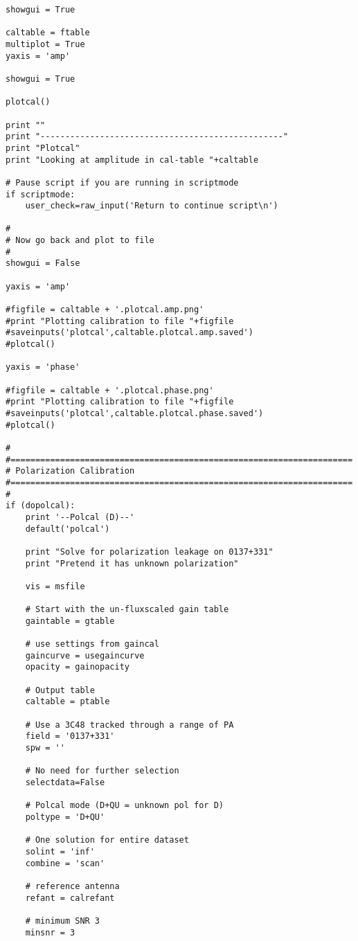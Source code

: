 \begin{verbatim}
showgui = True
    
caltable = ftable
multiplot = True
yaxis = 'amp'

showgui = True
    
plotcal()

print ""
print "-------------------------------------------------"
print "Plotcal"
print "Looking at amplitude in cal-table "+caltable

# Pause script if you are running in scriptmode
if scriptmode:
    user_check=raw_input('Return to continue script\n')

#
# Now go back and plot to file
#
showgui = False

yaxis = 'amp'

#figfile = caltable + '.plotcal.amp.png'
#print "Plotting calibration to file "+figfile
#saveinputs('plotcal',caltable.plotcal.amp.saved')
#plotcal()

yaxis = 'phase'

#figfile = caltable + '.plotcal.phase.png'
#print "Plotting calibration to file "+figfile
#saveinputs('plotcal',caltable.plotcal.phase.saved')
#plotcal()

#
#=====================================================================
# Polarization Calibration
#=====================================================================
#
if (dopolcal):
    print '--Polcal (D)--'
    default('polcal')
    
    print "Solve for polarization leakage on 0137+331"
    print "Pretend it has unknown polarization"

    vis = msfile

    # Start with the un-fluxscaled gain table
    gaintable = gtable

    # use settings from gaincal
    gaincurve = usegaincurve
    opacity = gainopacity
    
    # Output table
    caltable = ptable

    # Use a 3C48 tracked through a range of PA
    field = '0137+331'
    spw = ''

    # No need for further selection
    selectdata=False

    # Polcal mode (D+QU = unknown pol for D)
    poltype = 'D+QU'

    # One solution for entire dataset
    solint = 'inf'
    combine = 'scan'

    # reference antenna
    refant = calrefant

    # minimum SNR 3
    minsnr = 3


\end{verbatim}
